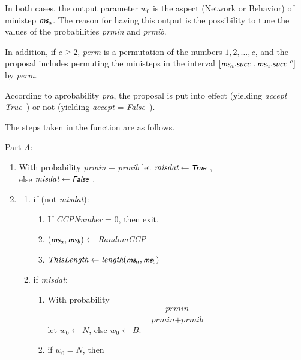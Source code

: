 \documentclass[a4paper,12pt,fleqn]{article}
\newcommand{\nnm}[1]{\textsf{\small\textit{#1}\ }}
\newcommand{\ms}{\textsl{\textsf{\small ms}}} %
\newcommand{\addce}[1]{{\textcolor[named]{Black}{#1}}}
\begin{document}
In both cases, the output parameter $w_0$ is the aspect
(Network or Behavior) of ministep $\ms_a$.
The reason for having this output is the possibility to tune
the values of the probabilities \textit{prmin} and  \textit{prmib}.

In addition, if $c \geq 2$,
\textit{perm} is a permutation of the numbers $ 1, 2, \ldots, c$,
and the proposal includes permuting the ministeps in the interval
$[\ms_a.\nnm{succ}, \ms_a.\nnm{succ}^{c}]$ by \textit{perm}.

According to aprobability \textit{pra},
the proposal is put into effect (yielding \textit{accept} = \nnm{True})
or not (yielding \textit{accept} = \nnm{False}).

The steps taken in the function are as follows.

Part \emph{A}:
\begin{enumerate}
\item With probability \textit{prmin} + \textit{prmib}
      let $\textit{misdat} \leftarrow \nnm{True}$,\\
      else $\textit{misdat} \leftarrow \nnm{False}$.
\item
\vspace*{-0.4em}
\begin{enumerate}
      \item if (not \textit{misdat}):
            \begin{enumerate}
            \item If \textit{CCPNumber} = 0, then exit.
            \item $(\ms_a, \ms_b) \leftarrow $ \textit{RandomCCP}
            \item $\textit{ThisLength} \leftarrow \textit{length}(\ms_a, \ms_b)$
            \end{enumerate}
      \item if \textit{misdat}:
            \begin{enumerate}
            \item  With probability
                   \[
                      \frac{\textit{prmin}}{\textit{prmin} + \textit{prmib}}
                   \]
                   let $w_0 \leftarrow N$,  else  $w_0 \leftarrow B$.
            \item  if $w_0 = N$, then
                    \begin{enumerate}

\end{enumerate}
\end{enumerate}
\end{enumerate}
\end{enumerate}
\end{document}
